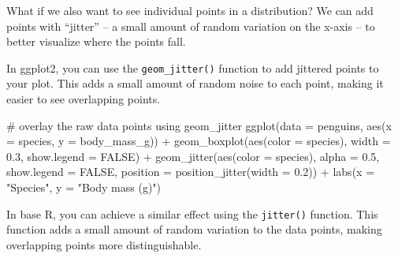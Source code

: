 \documentclass[
  letterpaper,
  DIV=11,
  numbers=noendperiod]{scrreprt}
\newenvironment{Shaded}{\begin{snugshade}}{\end{snugshade}}
\newcommand{\AttributeTok}[1]{\textcolor[rgb]{0.40,0.45,0.13}{#1}}
\newcommand{\CommentTok}[1]{\textcolor[rgb]{0.37,0.37,0.37}{#1}}
\newcommand{\ConstantTok}[1]{\textcolor[rgb]{0.56,0.35,0.01}{#1}}
\newcommand{\FloatTok}[1]{\textcolor[rgb]{0.68,0.00,0.00}{#1}}
\newcommand{\FunctionTok}[1]{\textcolor[rgb]{0.28,0.35,0.67}{#1}}
\newcommand{\NormalTok}[1]{\textcolor[rgb]{0.00,0.23,0.31}{#1}}
\newcommand{\SpecialCharTok}[1]{\textcolor[rgb]{0.37,0.37,0.37}{#1}}
\newcommand{\StringTok}[1]{\textcolor[rgb]{0.13,0.47,0.30}{#1}}
\begin{document}
\begin{tcolorbox}[enhanced jigsaw, bottomtitle=1mm, bottomrule=.15mm, toprule=.15mm, opacityback=0, leftrule=.75mm, breakable, colback=white, toptitle=1mm, left=2mm, coltitle=black, titlerule=0mm, opacitybacktitle=0.6, title=\textcolor{quarto-callout-tip-color}{\faLightbulb}\hspace{0.5em}{How to recreate this plot--try on your own first!}, rightrule=.15mm, arc=.35mm, colframe=quarto-callout-tip-color-frame, colbacktitle=quarto-callout-tip-color!10!white]

What if we also want to see individual points in a distribution? We can
add points with ``jitter'' -- a small amount of random variation on the
x-axis -- to better visualize where the points fall.

In ggplot2, you can use the \texttt{geom\_jitter()} function to add
jittered points to your plot. This adds a small amount of random noise
to each point, making it easier to see overlapping points.

\begin{Shaded}
\begin{Highlighting}[]
\CommentTok{\# overlay the raw data points using geom\_jitter}
\FunctionTok{ggplot}\NormalTok{(}\AttributeTok{data =}\NormalTok{ penguins, }\FunctionTok{aes}\NormalTok{(}\AttributeTok{x =}\NormalTok{ species, }\AttributeTok{y =}\NormalTok{ body\_mass\_g)) }\SpecialCharTok{+}
  \FunctionTok{geom\_boxplot}\NormalTok{(}\FunctionTok{aes}\NormalTok{(}\AttributeTok{color =}\NormalTok{ species), }\AttributeTok{width =} \FloatTok{0.3}\NormalTok{, }\AttributeTok{show.legend =} \ConstantTok{FALSE}\NormalTok{) }\SpecialCharTok{+}
  \FunctionTok{geom\_jitter}\NormalTok{(}\FunctionTok{aes}\NormalTok{(}\AttributeTok{color =}\NormalTok{ species), }\AttributeTok{alpha =} \FloatTok{0.5}\NormalTok{, }\AttributeTok{show.legend =} \ConstantTok{FALSE}\NormalTok{, }
     \AttributeTok{position =} \FunctionTok{position\_jitter}\NormalTok{(}\AttributeTok{width =} \FloatTok{0.2}\NormalTok{)) }\SpecialCharTok{+}
  \FunctionTok{labs}\NormalTok{(}\AttributeTok{x =} \StringTok{"Species"}\NormalTok{,}
       \AttributeTok{y =} \StringTok{"Body mass (g)"}\NormalTok{)}
\end{Highlighting}
\end{Shaded}

In base R, you can achieve a similar effect using the \texttt{jitter()}
function. This function adds a small amount of random variation to the
data points, making overlapping points more distinguishable.


\end{tcolorbox}
\end{document}
